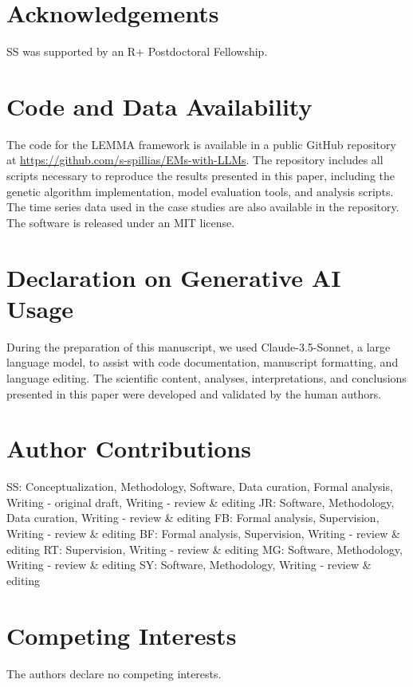 
\section*{Acknowledgements}
SS was supported by an R+ Postdoctoral Fellowship. 

\section*{Code and Data Availability}
The code for the LEMMA framework is available in a public GitHub repository at \url{https://github.com/s-spillias/EMs-with-LLMs}. The repository includes all scripts necessary to reproduce the results presented in this paper, including the genetic algorithm implementation, model evaluation tools, and analysis scripts. The time series data used in the case studies are also available in the repository. The software is released under an MIT license.

\section*{Declaration on Generative AI Usage}
During the preparation of this manuscript, we used Claude-3.5-Sonnet, a large language model, to assist with code documentation, manuscript formatting, and language editing. The scientific content, analyses, interpretations, and conclusions presented in this paper were developed and validated by the human authors. 

\section*{Author Contributions}
SS: Conceptualization, Methodology, Software, Data curation, Formal analysis, Writing - original draft, Writing - review \& editing
JR: Software, Methodology, Data curation, Writing - review \& editing
FB: Formal analysis, Supervision, Writing - review \& editing
BF: Formal analysis, Supervision, Writing - review \& editing
RT: Supervision, Writing - review \& editing
MG: Software, Methodology, Writing - review \& editing
SY: Software, Methodology, Writing - review \& editing

\section*{Competing Interests}
The authors declare no competing interests.


